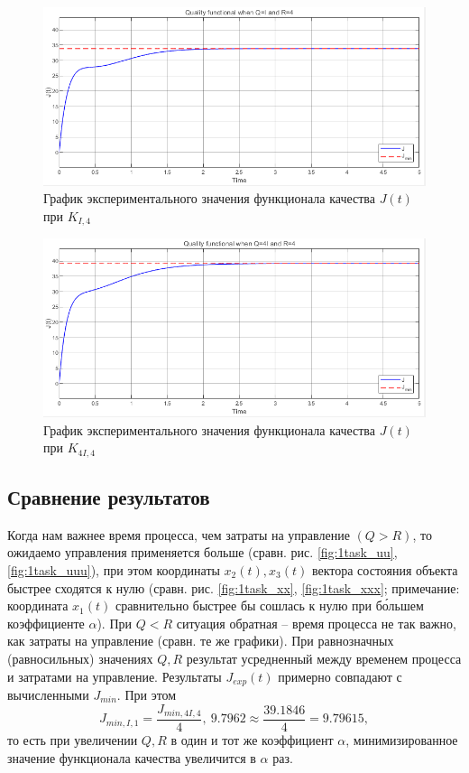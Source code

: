 \documentclass[a4paper, 12pt]{article}
\begin{document}
    \begin{figure}[H]
        \centering
        \includegraphics[scale=0.75]{1task_jjj.png}
        \captionsetup{skip=0pt}
        \caption{График экспериментального значения функционала качества $J(t)$ при $K_{I,4}$}
        \label{fig:1task_jjj}
    \end{figure}
    \begin{figure}[H]
        \centering
        \includegraphics[scale=0.75]{1task_jjjj.png}
        \captionsetup{skip=0pt}
        \caption{График экспериментального значения функционала качества $J(t)$ при $K_{4I,4}$}
        \label{fig:1task_jjjj}
    \end{figure}


    \subsection{Сравнение результатов}
    Когда нам важнее время процесса, чем затраты на управление $(Q>R)$, то
    ожидаемо управления применяется больше (сравн. рис. \ref{fig:1task_uu}, \ref{fig:1task_uuu}),
    при этом координаты $x_2(t),x_3(t)$ вектора состояния объекта быстрее сходятся к нулю (сравн. рис. \ref{fig:1task_xx}, \ref{fig:1task_xxx};
    примечание: координата $x_1(t)$ сравнительно быстрее бы сошлась к нулю при б\'{о}льшем коэффициенте $\alpha$).
    При $Q<R$ ситуация обратная -- время процесса не так важно, как затраты на управление (сравн. те же графики).
    При равнозначных (равносильных) значениях $Q,R$ результат усредненный между временем процесса и затратами на управление.
    Результаты $J_{exp}(t)$ примерно совпадают с вычисленными $J_{min}$. При этом
    $$J_{min,I,1}=\dfrac{J_{min,4I,4}}{4},\ 9.7962\approx\dfrac{39.1846}{4}=9.79615,$$ то есть при увеличении
    $Q,R$ в один и тот же коэффициент $\alpha$, минимизированное значение функционала качества увеличится в
    $\alpha$ раз.
\end{document}
